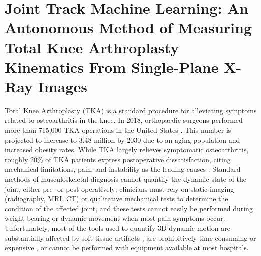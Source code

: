 \chapter{Joint Track Machine Learning: An Autonomous Method of Measuring Total Knee Arthroplasty Kinematics From Single-Plane X-Ray Images}{\renewcommand*{\thefootnote}{\fnsymbol{footnote}}


\label{sec:jtml}
Total Knee Arthroplasty (TKA) is a standard procedure for alleviating symptoms related to osteoarthritis in the knee.
In 2018, orthopaedic surgeons performed more than 715,000 TKA operations in the United States \cite{agencyforhealthcareresearchandqualityHCUPFastStats}.
This number is projected to increase to 3.48 million by 2030 \cite{kurtzProjectionsPrimaryRevision2007} due to an aging population and increased obesity rates.
While TKA largely relieves symptomatic osteoarthritis, roughly 20\% of TKA patients express postoperative dissatisfaction, citing mechanical limitations, pain, and instability as the leading causes \cite{bakerRolePainFunction2007,bournePatientSatisfactionTotal2010,scottPredictingDissatisfactionFollowing2010}.
Standard methods of musculoskeletal diagnosis cannot quantify the dynamic state of the joint, either pre- or post-operatively; clinicians must rely on static imaging (radiography, MRI, CT) or qualitative mechanical tests to determine the condition of the affected joint, and these tests cannot easily be performed during weight-bearing or dynamic movement when most pain symptoms occur.
Unfortunately, most of the tools used to quantify 3D dynamic motion are substantially affected by soft-tissue artifacts \cite{gaoInvestigationSoftTissue2008,stagniQuantificationSoftTissue2005,linEffectsSoftTissue2016}, are prohibitively time-consuming or expensive \cite{daemsValidationThreedimensionalTotal2016}, or cannot be performed with equipment available at most hospitals.

}
